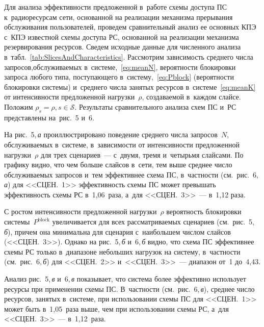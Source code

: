 \begin{multicols}{2}
Для анализа эффективности предложенной в~работе схемы доступа ПС к~радиоресурсам сети, основанной на реализации механизма прерывания обслуживания 
пользователей, проведем \mbox{сравнительный} анализ ее основных КПЭ с~КПЭ известной 
схемы доступа РС, основанной на реализации механизма резервирования ресурсов. 
Сведем исходные данные для численного анализа 
в~табл.~\ref{tab:SlicesAndCharacteristics}.
Рас\-смот\-рим зависимость среднего числа запросов,\linebreak об\-слу\-жи\-ва\-емых в~сис\-те\-ме,~\eqref{eq:meanN}, вероятности блокировки запроса любого типа, 
поступающего в~сис\-те\-му,~\eqref{eq:Pblock} (вероятности блокировки сис\-те\-мы) и~среднего чис\-ла занятых ресурсов в~сис\-те\-ме~\eqref{eq:meanK} от \mbox{интенсивности} 
предложенной нагрузки~$\rho$, созда\-ва\-емой в~каж\-дом слайсе. Положим $\rho_s=\rho, 
s\in\mathcal{S}$. Результаты сравнительного анализа схем ПС и~РС представлены 
на~рис.~5 и~6.




На рис.~5,\,\textit{а} проиллюстрировано поведение среднего числа запросов~$N$, 
об\-слу\-жи\-ва\-емых в~сис\-те\-ме, в~за\-ви\-си\-мости от интенсивности предложенной нагрузки~$\rho$ для трех сценариев~--- с~двумя, тремя и~четырьмя слайсами. По графику 
видно, что чем больше слайсов в~сети, тем выше сред\-нее чис\-ло об\-слу\-жи\-ва\-емых 
запросов и~тем эф\-фек\-тив\-нее схема ПС, в~част\-ности (см.\ рис.~6,\,\textit{а}) 
для <<СЦЕН.~1>> эф\-фек\-тив\-ность схемы ПС может превышать эф\-фек\-тив\-ность схемы РС в~1,06~раза, а~для <<СЦЕН.~3>>~--- в~1,12 раза.



С ростом интенсивности предложенной нагрузки~$\rho$ вероятность блокировки 
системы~$P^{\mathrm{block}}$ увеличивается для всех рассматриваемых сценариев 
(см.\ рис.~5,\,\textit{б}), причем она минимальна для сценария с~наибольшем числом 
слайсов (<<СЦЕН.~3>>). Однако на рис.~5,\,\textit{б} и~6,\,\textit{б} 
видно, что схема ПС эффективнее схемы РС только в~диапазоне небольших нагрузок 
на сис\-те\-му, в~част\-ности (см.\ рис.~6,\,\textit{б}) для <<СЦЕН.~2>> 
и~<<СЦЕН.~3>>~--- диапазон от~1 до~4,43.



Анализ  рис.~5,\,\textit{в} и~6,\,\textit{в} показывает, что сис\-те\-ма более 
эффективно использует ресурсы при применении схемы ПС. В~част\-ности 
(см.\ рис.~6,\,\textit{в}), сред\-нее чис\-ло ресурсов, занятых в~сис\-те\-ме, при 
использовании схемы ПС для <<СЦЕН.~1>> может быть в~1,05~раза выше, чем при 
использовании схемы РС, а~для <<СЦЕН.~3>>~--- в~1,12~раза.

\end{multicols}

